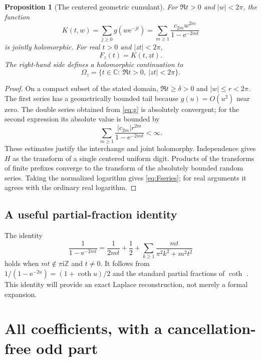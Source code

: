 \documentclass[11pt,a4paper]{article}
\numberwithin{equation}{section}
\newtheorem{proposition}[theorem]{Proposition}
\theoremstyle{definition}
\theoremstyle{remark}
\newcommand{\C}{\mathbb C}
\newcommand{\ii}{\mathrm i}
\newcommand{\e}{\mathrm e}
\begin{document}
\begin{proposition}[The centered geometric cumulant]
\label{prop:K}
For $\Re t>0$ and $|w|<2\pi$, the function
\begin{equation}
 K(t,w)=\sum_{j\ge0}g(w\e^{-jt})
       =\sum_{m\ge1}\frac{c_{2m}w^{2m}}{1-\e^{-2mt}}
 \label{eq:K}
\end{equation}
is jointly holomorphic. For real $t>0$ and $|zt|<2\pi$,
\begin{equation}
 F_z(t)=K(t,zt).
 \label{eq:Fseries}
\end{equation}
The right-hand side defines a holomorphic continuation to
\begin{equation}
 \Omega_z=\{t\in\C:\ \Re t>0,\ |zt|<2\pi\}.
 \label{eq:Omega}
\end{equation}
\end{proposition}
\begin{proof}
On a compact subset of the stated domain, $\Re t\ge\delta>0$ and $|w|\le r<2\pi$. The first series has a geometrically bounded tail because $g(u)=O(u^2)$ near zero. The double series obtained from \eqref{eq:g} is absolutely convergent; for the second expression its absolute value is bounded by
\[
 \sum_{m\ge1}\frac{|c_{2m}|r^{2m}}{1-\e^{-2m\delta}}<\infty.
\]
These estimates justify the interchange and joint holomorphy. Independence gives $H$ as the transform of a single centered uniform digit. Products of the transforms of finite prefixes converge to the transform of the absolutely bounded random series. Taking the normalized logarithm gives \eqref{eq:Fseries}; for real arguments it agrees with the ordinary real logarithm.
\end{proof}

\subsection{A useful partial-fraction identity}
The identity
\begin{equation}
 \frac1{1-\e^{-2mt}}
 =\frac1{2mt}+\frac12+
   \sum_{k\ge1}\frac{mt}{\pi^2k^2+m^2t^2}
 \label{eq:coth}
\end{equation}
holds when $mt\notin\pi\ii\mathbb Z$ and $t\ne0$. It follows from
$1/(1-\e^{-2u})=(1+\coth u)/2$ and the standard partial fractions of $\coth$ \cite[\S4.36]{dlmf}. This identity will provide an exact Laplace reconstruction, not merely a formal expansion.

\section{All coefficients, with a cancellation-free odd part}
\label{sec:coeff}
\end{document}
